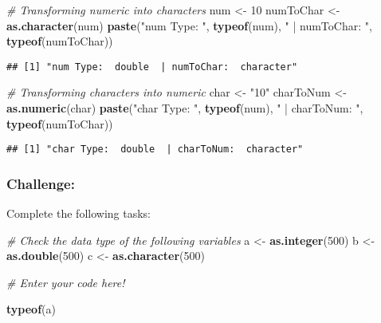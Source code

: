 \documentclass[
]{article}
\newenvironment{Shaded}{\begin{snugshade}}{\end{snugshade}}
\newcommand{\CommentTok}[1]{\textcolor[rgb]{0.56,0.35,0.01}{\textit{#1}}}
\newcommand{\DecValTok}[1]{\textcolor[rgb]{0.00,0.00,0.81}{#1}}
\newcommand{\FunctionTok}[1]{\textcolor[rgb]{0.13,0.29,0.53}{\textbf{#1}}}
\newcommand{\NormalTok}[1]{#1}
\newcommand{\OtherTok}[1]{\textcolor[rgb]{0.56,0.35,0.01}{#1}}
\newcommand{\StringTok}[1]{\textcolor[rgb]{0.31,0.60,0.02}{#1}}
\begin{document}
\begin{Shaded}
\begin{Highlighting}[]
\CommentTok{\# Transforming numeric into characters}
\NormalTok{num }\OtherTok{\textless{}{-}} \DecValTok{10}
\NormalTok{numToChar }\OtherTok{\textless{}{-}} \FunctionTok{as.character}\NormalTok{(num)}
\FunctionTok{paste}\NormalTok{(}\StringTok{"num Type: "}\NormalTok{, }\FunctionTok{typeof}\NormalTok{(num), }\StringTok{" | numToChar: "}\NormalTok{, }\FunctionTok{typeof}\NormalTok{(numToChar))}
\end{Highlighting}
\end{Shaded}

\begin{verbatim}
## [1] "num Type:  double  | numToChar:  character"
\end{verbatim}

\begin{Shaded}
\begin{Highlighting}[]
\CommentTok{\# Transforming characters into numeric}
\NormalTok{char }\OtherTok{\textless{}{-}} \StringTok{"10"}
\NormalTok{charToNum }\OtherTok{\textless{}{-}} \FunctionTok{as.numeric}\NormalTok{(char)}
\FunctionTok{paste}\NormalTok{(}\StringTok{"char Type: "}\NormalTok{, }\FunctionTok{typeof}\NormalTok{(num), }\StringTok{" | charToNum: "}\NormalTok{, }\FunctionTok{typeof}\NormalTok{(numToChar))}
\end{Highlighting}
\end{Shaded}

\begin{verbatim}
## [1] "char Type:  double  | charToNum:  character"
\end{verbatim}

\subsubsection{Challenge:}\label{challenge}

Complete the following tasks:

\begin{Shaded}
\begin{Highlighting}[]
\CommentTok{\# Check the data type of the following variables}
\NormalTok{a }\OtherTok{\textless{}{-}} \FunctionTok{as.integer}\NormalTok{(}\DecValTok{500}\NormalTok{)}
\NormalTok{b }\OtherTok{\textless{}{-}} \FunctionTok{as.double}\NormalTok{(}\DecValTok{500}\NormalTok{)}
\NormalTok{c }\OtherTok{\textless{}{-}} \FunctionTok{as.character}\NormalTok{(}\DecValTok{500}\NormalTok{)}

\CommentTok{\# Enter your code here!}

\FunctionTok{typeof}\NormalTok{(a)}
\end{Highlighting}
\end{Shaded}
\end{document}
